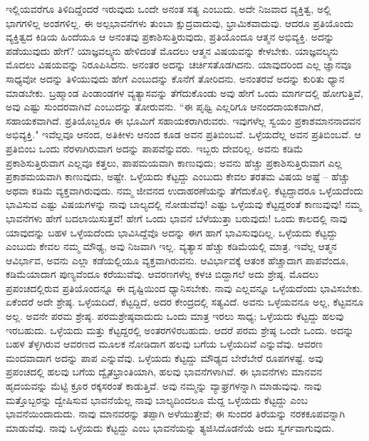 \newpage

ಇಲ್ಲಿಯವರೆಗೂ ತಿಳಿದಿದ್ದೆಂದರೆ ಇರುವುದು ಒಂದೇ ಅನಂತ ಸತ್ಯ ಎಂಬುದು. ಅದೇ ನಿಜವಾದ ವ್ಯಕ್ತಿತ್ವ, ಅಲ್ಲಿ ಭಾಗಗಳಿಲ್ಲ ಅಂಶಗಳಿಲ್ಲ. ಈ ಅಲ್ಪಭಾವನೆಗಳು ತುಂಬಾ ಕ್ಷುದ್ರವಾದುವು, ಭ್ರಾಮಿಕವಾದುವು. ಆದರೂ ಪ್ರತಿಯೊಂದು ವ್ಯಕ್ತಿತ್ವದ ಕಿಡಿಯ ಹಿಂದೆಯೂ ಆ ಅನಂತವು ಪ್ರಕಾಶಿಸುತ್ತಿರುವುದು, ಪ್ರತಿಯೊಂದೂ ಆತ್ಮನ ಅಭಿವ್ಯಕ್ತಿ. ಅದನ್ನು ಪಡೆಯುವುದು ಹೇಗೆ? ಯಾಜ್ಞವಲ್ಕ್ಯನು ಹೇಳಿದಂತೆ ಮೊದಲು ಆತ್ಮನ ವಿಷಯವನ್ನು ಕೇಳಬೇಕು. ಯಾಜ್ಞವಲ್ಕ್ಯನು ಮೊದಲು ವಿಷಯವನ್ನು ನಿರೂಪಿಸಿದನು. ಅನಂತರ ಅದನ್ನು ಚರ್ಚಿಸತೊಡಗಿದನು. ಯಾವುದರಿಂದ ಎಲ್ಲ ಜ್ಞಾನವೂ ಸಾಧ್ಯವೋ ಅದನ್ನು ತಿಳಿಯುವುದು ಹೇಗೆ ಎಂಬುದನ್ನು ಕೊನೆಗೆ ತೋರಿದನು. ಅನಂತರವೆ ಅದನ್ನು ಕುರಿತು ಧ್ಯಾನ ಮಾಡಬೇಕು. ಬ್ರಹ್ಮಾಂಡ ಪಿಂಡಾಂಡಗಳ ವ್ಯತ್ಯಾಸವನ್ನು ತೆಗೆದುಕೊಂಡು ಅವು ಹೇಗೆ ಒಂದು ಮಾರ್ಗದಲ್ಲಿ ಹೋಗುತ್ತಿವೆ, ಅವು ಎಷ್ಟು ಸುಂದರವಾಗಿವೆ ಎಂಬುದನ್ನು ತೋರುವನು. “ಈ ಪೃಥ್ವಿ ಎಲ್ಲರಿಗೂ ಆನಂದದಾಯಕವಾಗಿದೆ, ಸಹಾಯಕವಾಗಿದೆ. ಪ್ರತಿಯೊಬ್ಬರೂ ಈ ಭೂಮಿಗೆ ಸಹಾಯಕರಾಗಿರುವರು. ಇವುಗಳೆಲ್ಲ ಸ್ವಯಂ ಪ್ರಕಾಶಮಾನನಾದವನ ಅಭಿವ್ಯಕ್ತಿ." ಇವೆಲ್ಲವೂ ಆನಂದ, ಅತಿಕೀಳು ಆನಂದ ಕೂಡ ಅವನ ಪ್ರತಿಬಿಂಬವೆ. ಒಳ್ಳೆಯದೆಲ್ಲ ಅವನ ಪ್ರತಿಬಿಂಬವೆ. ಆ ಪ್ರತಿಬಿಂಬ ಒಂದು ನೆರಳಾಗಿರುವಾಗ ಅದನ್ನು ಪಾಪವೆನ್ನುವರು. ಇಬ್ಬರು ದೇವರಿಲ್ಲ. ಅವನು ಕಡಿಮೆ ಪ್ರಕಾಶಿಸುತ್ತಿರುವಾಗ ಎಲ್ಲವೂ ಕತ್ತಲು, ಪಾಪಮಯವಾಗಿ ಕಾಣುವುದು; ಅವನು ಹೆಚ್ಚು ಪ್ರಕಾಶಿಸುತ್ತಿರುವಾಗ ಎಲ್ಲ ಪ್ರಕಾಶಮಯವಾಗಿ ಕಾಣುವುದು, ಅಷ್ಟೇ. ಒಳ್ಳೆಯದು ಕೆಟ್ಟದ್ದು ಎಂಬುದು ಕೇವಲ ತರತಮ ವಿಷಯ ಅಷ್ಟೆ – ಹೆಚ್ಚು ಅಥವಾ ಕಡಿಮೆ ವ್ಯಕ್ತವಾಗಿರುವುದು. ನಮ್ಮ ಜೀವನದ ಉದಾಹರಣೆಯನ್ನು ತೆಗೆದುಕೊಳ್ಳಿ. ಕೆಟ್ಟದ್ದಾದರೂ ಒಳ್ಳೆಯದೆಂದು ಭಾವಿಸುವ ಎಷ್ಟು ವಿಷಯಗಳನ್ನು ನಾವು ಬಾಲ್ಯದಲ್ಲಿ ನೋಡುವೆವು! ಎಷ್ಟು ಒಳ್ಳೆಯವು ಕೆಟ್ಟದ್ದರಂತೆ ಕಾಣುವುವು! ನಮ್ಮ ಭಾವನೆಗಳು ಹೇಗೆ ಬದಲಾಯಿಸುತ್ತವೆ! ಹೇಗೆ ಒಂದು ಭಾವನೆ ಬೆಳೆಯುತ್ತಾ ಬರುವುದು! ಒಂದು ಕಾಲದಲ್ಲಿ ನಾವು ಯಾವುದನ್ನು ಬಹಳ ಒಳ್ಳೆಯದೆಂದು ಭಾವಿಸಿದ್ದೆವೊ ಅದನ್ನು ಈಗ ಹಾಗೆ ಭಾವಿಸುವುದಿಲ್ಲ. ಒಳ್ಳೆಯದು ಕೆಟ್ಟದ್ದು ಎಂಬುದು ಕೇವಲ ನಮ್ಮ ಮೌಢ್ಯ, ಅವು ನಿಜವಾಗಿ ಇಲ್ಲ. ವ್ಯತ್ಯಾಸ ಹೆಚ್ಚು ಕಡಿಮೆಯಲ್ಲಿ ಮಾತ್ರ. ಇವೆಲ್ಲ ಆತ್ಮನ ಆವಿರ್ಭಾವ, ಅವನು ಎಲ್ಲಾ ಕಡೆಯಲ್ಲಿಯೂ ವ್ಯಕ್ತವಾಗಿರುವನು. ಆವಿರ್ಭಾವಕ್ಕೆ ಆತಂಕ ಹೆಚ್ಚಾದಾಗ ಪಾಪವೆಂದೂ, ಕಡಿಮೆಯಾದಾಗ ಪುಣ್ಯವೆಂದೂ ಕರೆಯುವೆವು. ಆವರಣಗಳೆಲ್ಲ ಕಳಚಿ ಬಿದ್ದಾಗಲೆ ಅದು ಶ್ರೇಷ್ಠ. ಮೊದಲು ಪ್ರಪಂಚದಲ್ಲಿರುವ ಪ್ರತಿಯೊಂದನ್ನೂ ಈ ದೃಷ್ಟಿಯಿಂದ ಧ್ಯಾನಿಸಬೇಕು. ನಾವು ಎಲ್ಲವನ್ನೂ ಒಳ್ಳೆಯದೆಂದು ಭಾವಿಸಬೇಕು. ಏಕೆಂದರೆ ಅದೇ ಶ್ರೇಷ್ಠ. ಒಳ್ಳೆಯದಿದೆ, ಕೆಟ್ಟದ್ದಿದೆ, ಅದರ ಕೇಂದ್ರದಲ್ಲಿ ಸತ್ಯವಿದೆ. ಅವನು ಒಳ್ಳೆಯವನೂ ಅಲ್ಲ, ಕೆಟ್ಟವನೂ ಅಲ್ಲ. ಅವನೇ ಪರಮ ಶ್ರೇಷ್ಠ. ಪರಮಶ್ರೇಷ್ಠವಾದುದು ಒಂದು ಮಾತ್ರ ಇರಲು ಸಾಧ್ಯ; ಒಳ್ಳೆಯದು ಕೆಟ್ಟದ್ದು ಹಲವು ಇರಬಹುದು. ಒಳ್ಳೆಯದು ಮತ್ತು ಕೆಟ್ಟದ್ದರಲ್ಲಿ ಅಂತರಗಳಿರಬಹುದು. ಆದರೆ ಪರಮ ಶ್ರೇಷ್ಠ ಒಂದೇ ಒಂದು. ಅದನ್ನು ಬಹಳ ತೆಳ್ಳಗಿರುವ ಆವರಣದ ಮೂಲಕ ನೋಡಿದಾಗ ಹಲವು ಬಗೆಯ ಒಳ್ಳೆಯದಿವೆ ಎನ್ನುವೆವು. ಆವರಣ ಮಂದವಾದಾಗ ಅದನ್ನು ಪಾಪ ಎನ್ನುವೆವು. ಒಳ್ಳೆಯದು ಕೆಟ್ಟದ್ದು ಮೌಢ್ಯದ ಬೇರೆಬೇರೆ ರೂಪಗಳಷ್ಟೆ. ಅವು ಪ್ರಪಂಚದಲ್ಲಿ ಹಲವು ಬಗೆಯ ದ್ವೈತಭ್ರಾಂತಿಯಾಗಿ, ಹಲವು ಭಾವನೆಗಳಾಗಿವೆ. ಈ ಭಾವನೆಗಳು ಮಾನವನ ಹೃದಯವನ್ನು ಮೆಟ್ಟಿ ಕ್ರೂರ ರಕ್ಕಸರಂತೆ ಕಾಡುತ್ತಿವೆ. ಅವು ನಮ್ಮನ್ನು ವ್ಯಾಘ್ರಗಳನ್ನಾಗಿ ಮಾಡುವುವು. ನಾವು ಮತ್ತೊಬ್ಬರನ್ನು ದ್ವೇಷಿಸುವ ಭಾವನೆಯೆಲ್ಲ ನಾವು ಬಾಲ್ಯದಿಂದಲೂ ಮೆದ್ದ ಒಳ್ಳೆಯದು ಕೆಟ್ಟದ್ದು ಎಂಬ ಭಾವನೆಯಿಂದಾದುದು. ನಾವು ಮಾನವರನ್ನು ತಪ್ಪಾಗಿ ಅಳೆಯುತ್ತೇವೆ; ಈ ಸುಂದರ ತಿರೆಯನ್ನು ನರಕಕೂಪವನ್ನಾಗಿ ಮಾಡುವೆವು. ನಾವು ಒಳ್ಳೆಯದು ಕೆಟ್ಟದ್ದು ಎಂಬ ಭಾವನೆಯನ್ನು ತ್ಯಜಿಸಿದೊಡನೆಯೆ ಅದು ಸ್ವರ್ಗವಾಗುವುದು.

